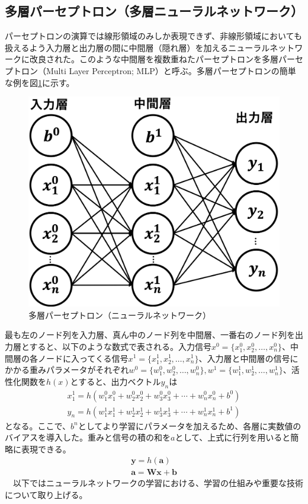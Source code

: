\subsection{多層パーセプトロン（多層ニューラルネットワーク）}
パーセプトロンの演算では線形領域のみしか表現できず、非線形領域においても扱えるよう入力層と出力層の間に中間層（隠れ層）を加えるニューラルネットワークに改良された。このような中間層を複数重ねたパーセプトロンを多層パーセプトロン（Multi Layer Perceptron; MLP）と呼ぶ。多層パーセプトロンの簡単な例を図\ref{mlp}に示す。\\
\begin{figure}[H]
	\begin{center}
 \includegraphics[keepaspectratio, scale=0.2]
 	{Figure/Deeplearning/mlp.png}
 		\caption{多層パーセプトロン（ニューラルネットワーク）}
 		\label{mlp}
	\end{center}
\end{figure}
最も左のノード列を入力層、真ん中のノード列を中間層、一番右のノード列を出力層とすると、以下のような数式で表される。入力信号$x^0 = \{ x_1^0, x_2^0, \ldots, x_n^0 \}$、中間層の各ノードに入ってくる信号$x^1 = \{ x_1^1, x_2^1, \ldots, x_n^1 \}$、入力層と中間層の信号にかかる重みパラメータがそれぞれ$w^0 = \{ w_1^0, w_2^0, \ldots, w_n^0 \}, w^1 = \{ w_1^1, w_2^1, \ldots, w_n^1 \}$、活性化関数を$h(x)$とすると、出力ベクトル$y_n$は
\begin{align}
x_1^1 = h(w_1^0 x_1^0 + w_2^0 x_2^0 + w_3^0 x_3^0 + \cdots + w_n^0 x_n^0 + b^0)\\
y_n = h(w_1^1 x_1^1 + w_2^1 x_2^1 + w_3^1 x_3^1 + \cdots + w_n^1 x_n^1 + b^1)
\end{align}
となる。ここで、$b^n$としてより学習にパラメータを加えるため、各層に実数値のバイアスを導入した。重みと信号の積の和を$a$として、上式に行列を用いると簡略に表現できる。
\begin{align}
\bm{y} = h(\bm{a})\\
\bm{a} = \bm{W} \bm{x} + \bm{b}
\end{align}
　以下ではニューラルネットワークの学習における、学習の仕組みや重要な技術について取り上げる。
